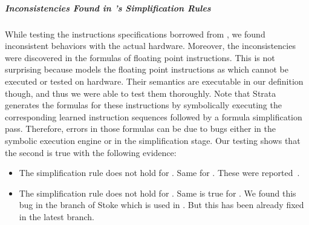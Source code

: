 \subparagraph{Inconsistencies Found in \Strata's Simplification Rules}
While testing the instructions specifications borrowed from \Strata, we found inconsistent behaviors with the actual hardware. Moreover, the inconsistencies were discovered in the formulas of floating point instructions. This is not surprising because \Strata models the floating point instructions as \uif{} which cannot be executed or tested on hardware. Their semantics are executable in our definition though, and thus we were able to test them thoroughly. Note that Strata generates the formulas for these instructions by symbolically  executing  the corresponding learned  instruction sequences followed by a formula simplification pass. Therefore, errors in those formulas can be due to bugs either in the symbolic execution engine or in the simplification stage. Our testing shows that the second is true with the following evidence:
  \begin{itemize}
      \item The simplification rule  does not hold for . Same for . These were reported~\cite{PC1}.
       
      \item The simplification rule  does not hold for .  Same is true for . We found this bug in the  branch of Stoke which is used in \Strata. But this has been already fixed in the latest \Stoke branch.
  \end{itemize}

